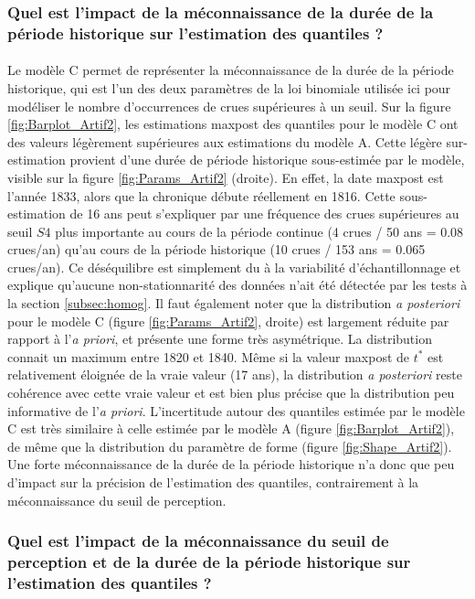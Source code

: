 	\subsubsection{Quel est l'impact de la méconnaissance de la durée de la période historique sur l'estimation des quantiles ?}	
	
	\paragraph{} Le modèle C permet de représenter la méconnaissance de la durée de la période historique, qui est l'un des deux paramètres de la loi binomiale utilisée ici pour modéliser le nombre d'occurrences de crues supérieures à un seuil. Sur la figure \ref{fig:Barplot_Artif2}, les estimations maxpost des quantiles pour le modèle C ont des valeurs légèrement supérieures aux estimations du modèle A. Cette légère sur-estimation provient d'une durée de période historique sous-estimée par le modèle, visible sur la figure \ref{fig:Params_Artif2} (droite). En effet, la date maxpost est l'année 1833, alors que la chronique débute réellement en 1816. Cette sous-estimation de 16 ans peut s'expliquer par une fréquence des crues supérieures au seuil $S4$ plus importante au cours de la période continue (4 crues / 50 ans = 0.08 crues/an) qu'au cours de la période historique (10 crues / 153 ans = 0.065 crues/an). Ce déséquilibre est simplement du à la variabilité d'échantillonnage et explique qu'aucune non-stationnarité des données n'ait été détectée par les tests à la section \ref{subsec:homog}. Il faut également noter que la distribution \textit{a posteriori} pour le modèle C (figure \ref{fig:Params_Artif2}, droite) est largement réduite par rapport à l'\textit{a priori}, et présente une forme très asymétrique. La distribution connait un maximum entre 1820 et 1840. Même si la valeur maxpost de $t^*$ est relativement éloignée de la vraie valeur (17 ans), la distribution \textit{a posteriori} reste cohérence avec cette vraie valeur et est bien plus précise que la distribution peu informative de l'\textit{a priori}. L'incertitude autour des quantiles estimée par le modèle C est très similaire à celle estimée par le modèle A (figure \ref{fig:Barplot_Artif2}), de même que la distribution du paramètre de forme (figure \ref{fig:Shape_Artif2}). Une forte méconnaissance de la durée de la période historique n'a donc que peu d'impact sur la précision de l'estimation des quantiles, contrairement à la méconnaissance du seuil de perception.
	
	\subsubsection{Quel est l'impact de la méconnaissance du seuil de perception et de la durée de la période historique sur l'estimation des quantiles ?}	
	

